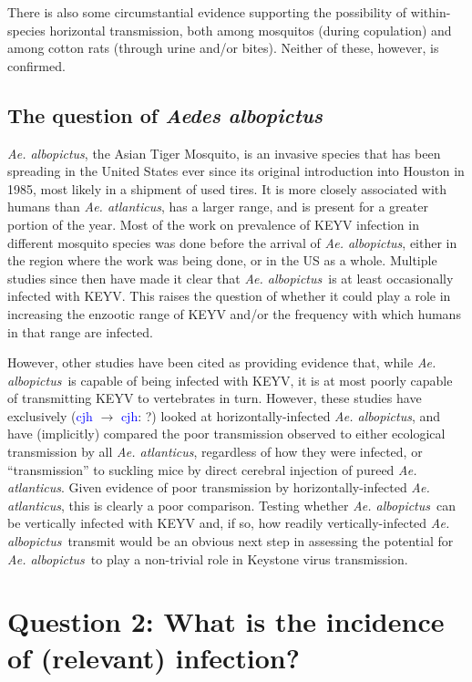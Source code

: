 \documentclass[12pt]{article}
\newcommand{\alb}{\textit{Ae. albopictus}}
\newcommand{\atl}{\textit{Ae. atlanticus}}
\newcommand{\cjh}{\textcolor{blue}{cjh}}
\newcommand{\msg}[3]{(#1 $\rightarrow$ #2: #3)}
\newcommand{\mcc}[1]{\msg\cjh\cjh{#1}}
\begin{document}
            There is also some circumstantial evidence supporting the possibility of within-species horizontal transmission, both among mosquitos (during copulation) and among cotton rats (through urine and/or bites). Neither of these, however, is confirmed.

        \subsection{The question of \textit{Aedes albopictus}}
            \label{albopictus}
            \alb, the Asian Tiger Mosquito, is an invasive species that has been spreading in the United States ever since its original introduction into Houston in 1985, most likely in a shipment of used tires. It is more closely associated with humans than \atl, has a larger range, and is present for a greater portion of the year. Most of the work on prevalence of KEYV infection in different mosquito species was done before the arrival of \alb, either in the region where the work was being done, or in the US as a whole. Multiple studies since then have made it clear that \alb\ is at least occasionally infected with KEYV. This raises the question of whether it could play a role in increasing the enzootic range of KEYV and/or the frequency with which humans in that range are infected.

            However, other studies have been cited as providing evidence that, while \alb\ is capable of being infected with KEYV, it is at most poorly capable of transmitting KEYV to vertebrates in turn. However, these studies have exclusively \mcc{?} looked at horizontally-infected \alb, and have (implicitly) compared the poor transmission observed to either ecological transmission by all \atl, regardless of how they were infected, or ``transmission'' to suckling mice by direct cerebral injection of pureed \atl. Given evidence of poor transmission by horizontally-infected \atl, this is clearly a poor comparison. Testing whether \alb\ can be vertically infected with KEYV and, if so, how readily vertically-infected \alb\ transmit would be an obvious next step in assessing the potential for \alb\ to play a non-trivial role in Keystone virus transmission.


    \section[Incidence of infection]{Question 2: What is the incidence of (relevant) infection?}
        \label{incidence}
\end{document}

